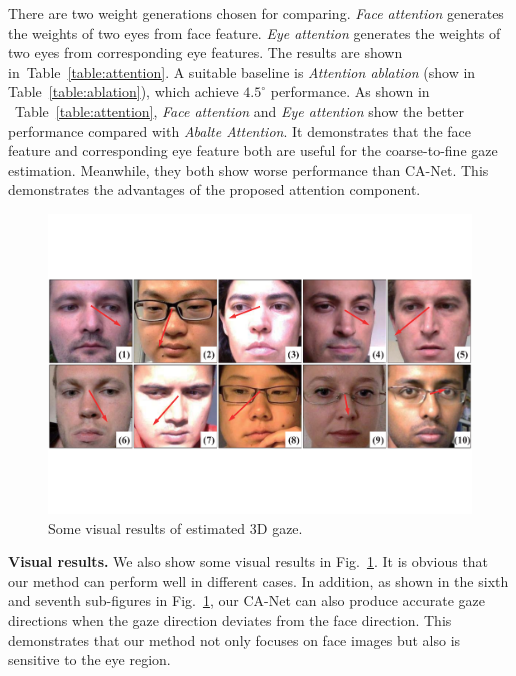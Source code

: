 \documentclass[letterpaper]{article} %
\newcommand{\Tref}[1]{Table~\ref{#1}}
\newcommand{\fref}[1]{Fig.~\ref{#1}}
\begin{document}
There are two weight generations chosen for comparing.
\emph{Face attention} generates the weights of two eyes from face feature.
\emph{Eye attention} generates the weights of two eyes from corresponding eye features.
The results are shown in~\Tref{table:attention}.
A suitable baseline is \emph{Attention ablation} (show in \Tref{table:ablation}), which achieve $4.5^{\circ}$ performance.
As shown in ~\Tref{table:attention}, \emph{Face attention} and \emph{Eye attention} show the better performance compared with \emph{Abalte Attention}.
It demonstrates that the face feature and corresponding eye feature both are useful for the coarse-to-fine gaze estimation.
Meanwhile, they both show worse performance than CA-Net.
This demonstrates the advantages of the proposed attention component. 

\begin{figure}[t]
	\begin{center}
		\includegraphics[width=0.99\columnwidth]{Figure-case.pdf}	
	\end{center}
	\caption{Some visual results of estimated 3D gaze.}
	\label{fig:casestudy}
\end{figure}

\textbf{Visual results.}
We also show some visual results in \fref{fig:casestudy}.
It is obvious that our method can perform well in different cases.
In addition, as shown in the sixth and seventh sub-figures in \fref{fig:casestudy}, our CA-Net can also produce accurate gaze directions when the gaze direction deviates from the face direction.
This demonstrates that our method not only focuses on face images but also is sensitive to the eye region.
\end{document}
